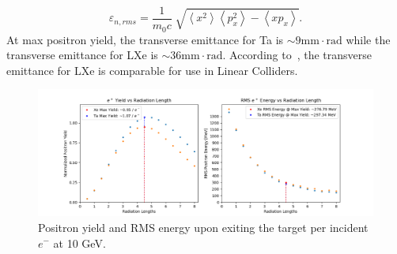 \documentclass[%
reprint,
nofootinbib,
amsmath, amssymb,
aps,
floatfix,
]{revtex4-2}
\begin{document}
\begin{equation}
    \varepsilon_{n,rms} = \frac{1}{m_0c}\sqrt[]{\left\langle x^2 \right\rangle \left\langle p_x^2 \right\rangle - \left\langle xp_x \right\rangle}. \label{eq:Emittance}
\end{equation}
At max positron yield, the transverse emittance for Ta
is $\sim 9\textrm{mm}\cdot\textrm{rad}$ while the transverse emittance for LXe is $\sim 36\textrm{mm}\cdot\textrm{rad}$.
According to~\cite{Tang1995, Sheppard2003}, the transverse emittance for LXe is comparable for use in Linear Colliders.


\begin{figure}
    \includegraphics[width = \linewidth]{../images/CompYield.png}
    \caption{\label{fig:Yield} Positron yield and RMS energy upon exiting the target 
    per incident $e^-$ at 10 GeV.}
\end{figure}
\end{document}
